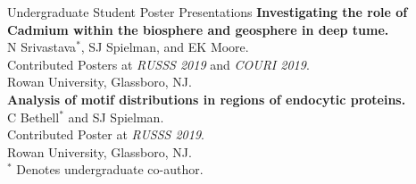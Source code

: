 \documentclass{resume} %
\begin{document}
\begin{rSection}{Undergraduate Student Poster Presentations}
\textbf{Investigating the role of Cadmium within the biosphere and geosphere in deep tume.}
\\ N Srivastava$^\ast$, SJ Spielman, and EK Moore.
\\ Contributed Posters at \emph{RUSSS 2019} and \emph{COURI 2019}.
\\ Rowan University, Glassboro, NJ.\\

\textbf{Analysis of motif distributions in regions of endocytic proteins.}
\\ C Bethell$^\ast$ and SJ Spielman.
\\ Contributed Poster at \emph{RUSSS 2019}.
\\ Rowan University, Glassboro, NJ.\\


$^\ast$ Denotes undergraduate co-author.

\end{rSection}






\end{document}
